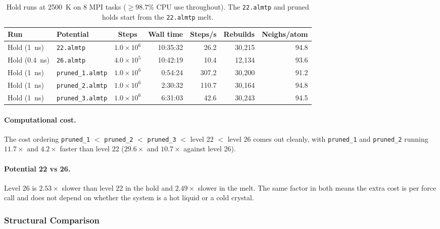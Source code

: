 \documentclass{article}
\begin{document}
\begin{table}[H]
    \centering
    \small
    \begin{tabular}{l|l|c|r|r|r|r}
        \toprule
        Run & Potential & Steps & Wall time & Steps/s & Rebuilds & Neighs/atom \\
        \midrule
        Hold (1~ns)   & \texttt{22.almtp}        & $1.0\times10^6$ & 10:35:32 & 26.2  & 30{,}215 & 94.8 \\
        Hold (0.4~ns) & \texttt{26.almtp}        & $4.0\times10^5$ & 10:42:19 & 10.4  & 12{,}134 & 93.6 \\
        Hold (1~ns)   & \texttt{pruned\_1.almtp} & $1.0\times10^6$ & 0:54:24  & 307.2 & 30{,}200 & 91.2 \\
        Hold (1~ns)   & \texttt{pruned\_2.almtp} & $1.0\times10^6$ & 2:30:32  & 110.7 & 30{,}164 & 94.8 \\
        Hold (1~ns)   & \texttt{pruned\_3.almtp} & $1.0\times10^6$ & 6:31:03  & 42.6  & 30{,}243 & 94.5 \\
        \bottomrule
    \end{tabular}
    \caption{Hold runs at 2500~K on 8 MPI tasks ($\geq 98.7\%$ CPU use throughout). The \texttt{22.almtp} and pruned holds start from the \texttt{22.almtp} melt.}
    \label{tab:melt_hold_bench}
\end{table}

\paragraph{Computational cost.}
The cost ordering \texttt{pruned\_1} $<$ \texttt{pruned\_2} $<$ \texttt{pruned\_3} $<$ level 22 $<$ level 26 comes out cleanly, with \texttt{pruned\_1} and \texttt{pruned\_2} running $11.7\times$ and $4.2\times$ faster than level 22 ($29.6\times$ and $10.7\times$ against level 26).

\paragraph{Potential 22 vs 26.}
Level 26 is $2.53\times$ slower than level 22 in the hold and $2.49\times$ slower in the melt. The same factor in both means the extra cost is per force call and does not depend on whether the system is a hot liquid or a cold crystal.

\subsubsection{Structural Comparison}
\end{document}
